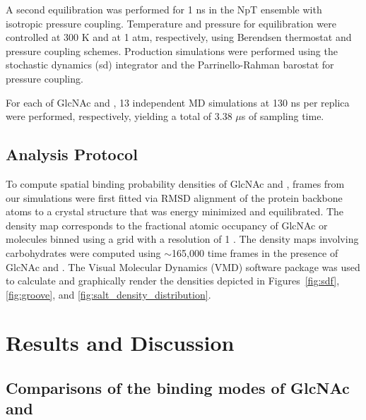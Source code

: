A second equilibration was performed for 1 ns in the NpT ensemble with isotropic pressure coupling. Temperature and pressure for equilibration were controlled at 300 K and at 1 atm, respectively, using Berendsen thermostat and pressure coupling schemes. Production simulations were performed using the stochastic dynamics (sd) integrator and the Parrinello-Rahman barostat for pressure coupling.

For each of GlcNAc and \glucosamine, 13 independent MD simulations at 130 ns per replica were performed, respectively, yielding a total of 3.38 $\mu$s of sampling time.

\subsection*{Analysis Protocol}
To compute spatial binding probability densities of GlcNAc and \glucosamine, frames from our simulations were first fitted via RMSD alignment of the protein backbone atoms to a crystal structure that was energy minimized and equilibrated. The density map corresponds to the fractional atomic occupancy of GlcNAc or \glucosamine molecules binned using a grid with a resolution of 1 \angstrom.  The density maps involving carbohydrates were computed using $\sim$165,000 time frames in the presence of GlcNAc and \glucosamine. The Visual Molecular Dynamics (VMD) software package\cite{Humphrey:1996to} was used to calculate and graphically render the densities depicted in Figures~\ref{fig:sdf}, \ref{fig:groove}, and \ref{fig:salt_density_distribution}.

\section{Results and Discussion}


\subsection{Comparisons of the binding modes of GlcNAc and \glucosamine}

